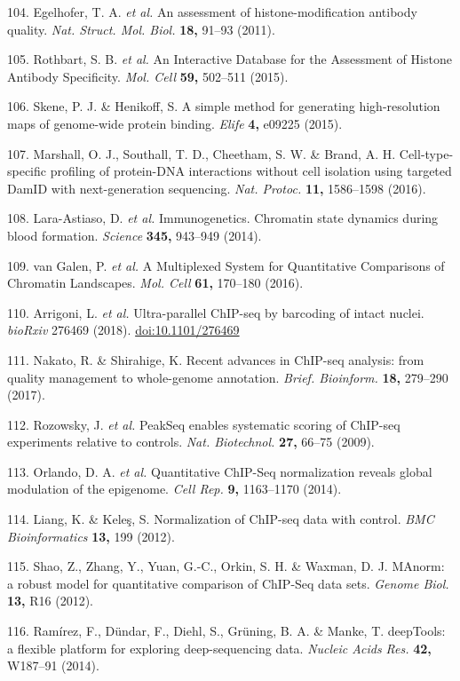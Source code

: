 \documentclass[11pt,twoside]{MPIthesis}
\theoremstyle{definition}
\theoremstyle{definition}
\theoremstyle{definition}
\theoremstyle{remark}
\begin{document}
104. Egelhofer, T. A. \emph{et al.} An assessment of
histone-modification antibody quality. \emph{Nat. Struct. Mol. Biol.}
\textbf{18,} 91--93 (2011).

105. Rothbart, S. B. \emph{et al.} An Interactive Database for the
Assessment of Histone Antibody Specificity. \emph{Mol. Cell}
\textbf{59,} 502--511 (2015).

106. Skene, P. J. \& Henikoff, S. A simple method for generating
high-resolution maps of genome-wide protein binding. \emph{Elife}
\textbf{4,} e09225 (2015).

107. Marshall, O. J., Southall, T. D., Cheetham, S. W. \& Brand, A. H.
Cell-type-specific profiling of protein-DNA interactions without cell
isolation using targeted DamID with next-generation sequencing.
\emph{Nat. Protoc.} \textbf{11,} 1586--1598 (2016).

108. Lara-Astiaso, D. \emph{et al.} Immunogenetics. Chromatin state
dynamics during blood formation. \emph{Science} \textbf{345,} 943--949
(2014).

109. van Galen, P. \emph{et al.} A Multiplexed System for Quantitative
Comparisons of Chromatin Landscapes. \emph{Mol. Cell} \textbf{61,}
170--180 (2016).

110. Arrigoni, L. \emph{et al.} Ultra-parallel ChIP-seq by barcoding of
intact nuclei. \emph{bioRxiv} 276469 (2018). \url{doi:10.1101/276469}

111. Nakato, R. \& Shirahige, K. Recent advances in ChIP-seq analysis:
from quality management to whole-genome annotation. \emph{Brief.
Bioinform.} \textbf{18,} 279--290 (2017).

112. Rozowsky, J. \emph{et al.} PeakSeq enables systematic scoring of
ChIP-seq experiments relative to controls. \emph{Nat. Biotechnol.}
\textbf{27,} 66--75 (2009).

113. Orlando, D. A. \emph{et al.} Quantitative ChIP-Seq normalization
reveals global modulation of the epigenome. \emph{Cell Rep.} \textbf{9,}
1163--1170 (2014).

114. Liang, K. \& Keleş, S. Normalization of ChIP-seq data with control.
\emph{BMC Bioinformatics} \textbf{13,} 199 (2012).

115. Shao, Z., Zhang, Y., Yuan, G.-C., Orkin, S. H. \& Waxman, D. J.
MAnorm: a robust model for quantitative comparison of ChIP-Seq data
sets. \emph{Genome Biol.} \textbf{13,} R16 (2012).

116. Ramírez, F., Dündar, F., Diehl, S., Grüning, B. A. \& Manke, T.
deepTools: a flexible platform for exploring deep-sequencing data.
\emph{Nucleic Acids Res.} \textbf{42,} W187--91 (2014).
\end{document}
